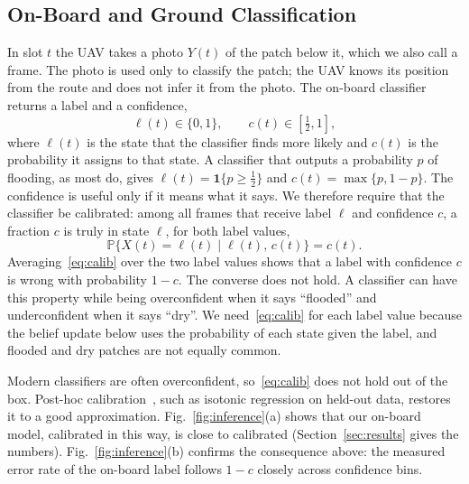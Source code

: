 \documentclass[journal]{IEEEtran}
\theoremstyle{remark}
\newcommand{\Prob}{\mathbb{P}}
\newcommand{\ind}[1]{\mathbf{1}\{#1\}}
\newcommand{\lab}{\ell}
\begin{document}
\subsection{On-Board and Ground Classification}
In slot $t$ the UAV takes a photo $Y(t)$ of the patch below it, which we also call a frame. The photo is used only to classify the patch; the UAV knows its position from the route and does not infer it from the photo. The on-board classifier returns a label and a confidence,
\begin{equation}\label{eq:label}
\lab(t)\in\{0,1\},\qquad c(t)\in[\tfrac12,1],
\end{equation}
where $\lab(t)$ is the state that the classifier finds more likely and $c(t)$ is the probability it assigns to that state. A classifier that outputs a probability $p$ of flooding, as most do, gives $\lab(t)=\ind{p\ge\frac12}$ and $c(t)=\max\{p,1-p\}$. The confidence is useful only if it means what it says. We therefore require that the classifier be calibrated: among all frames that receive label $\lab$ and confidence $c$, a fraction $c$ is truly in state $\lab$, for both label values,
\begin{equation}\label{eq:calib}
\Prob\big\{X(t)=\lab(t)\mid\lab(t),\,c(t)\big\}=c(t).
\end{equation}
Averaging~\eqref{eq:calib} over the two label values shows that a label with confidence $c$ is wrong with probability $1-c$. The converse does not hold. A classifier can have this property while being overconfident when it says ``flooded'' and underconfident when it says ``dry''. We need~\eqref{eq:calib} for each label value because the belief update below uses the probability of each state given the label, and flooded and dry patches are not equally common.

Modern classifiers are often overconfident, so~\eqref{eq:calib} does not hold out of the box. Post-hoc calibration~\cite{guo2017calibration}, such as isotonic regression on held-out data, restores it to a good approximation. Fig.~\ref{fig:inference}(a) shows that our on-board model, calibrated in this way, is close to calibrated (Section~\ref{sec:results} gives the numbers). Fig.~\ref{fig:inference}(b) confirms the consequence above: the measured error rate of the on-board label follows $1-c$ closely across confidence bins.
\end{document}
